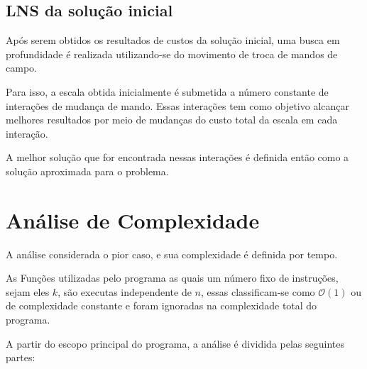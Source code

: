 \documentclass[12pt,a4paper]{article}
\numberwithin{figure}{section}
\numberwithin{table}{section}
\begin{document}
\subsection{LNS da solução inicial}

Após serem obtidos os resultados de custos da solução inicial, uma busca em profundidade é realizada utilizando-se do movimento de troca de mandos de campo. 

Para isso, a escala obtida inicialmente é submetida a número constante de interações de mudança de mando. Essas interações tem como objetivo alcançar melhores resultados por meio de mudanças do custo total da escala em cada interação.

A melhor solução que for encontrada nessas interações é definida então como a solução aproximada para o problema. 

\section{Análise de Complexidade}

A análise considerada o pior caso, e sua complexidade é definida por tempo.

As Funções utilizadas pelo programa as quais um número fixo de instruções, sejam eles $k$, são executas independente de $n$, essas classificam-se como $\mathcal{O}(1)$ ou de complexidade constante e foram ignoradas na complexidade total do programa.

A partir do escopo principal do programa, a análise é dividida pelas seguintes partes:
\end{document}
